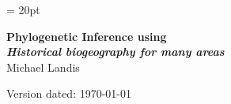 \documentclass[11pt]{article}
\begin{document}
\renewcommand{\headrulewidth}{0.5pt}
\headsep = 20pt
\lhead{ }

\thispagestyle{plain}
\begin{center}

\textbf{\LARGE Phylogenetic Inference using \RevBayes}\\\vspace{2mm}
\textbf{\it{\Large Historical biogeography for many areas}}\\\vspace{2mm}
\vspace{1cm}
{\Large Michael Landis}
\vspace{1cm}
\end{center}

\def \ResourcePath {./}
\def \GlobalResourcePath {../}




Version dated: \today
\end{document}
